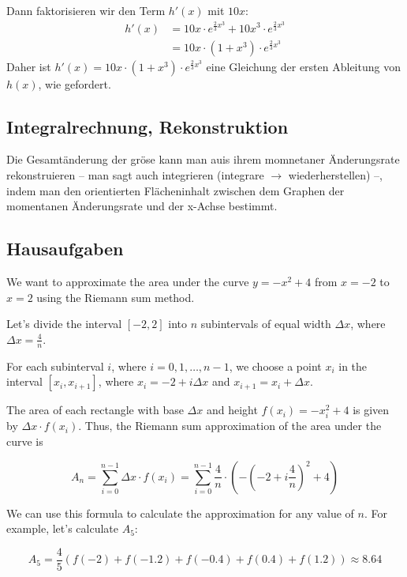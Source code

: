 \documentclass{report}
\begin{document}
Dann faktorisieren wir den Term $h'(x)$ mit $10x$:
\begin{align*}
  h'(x) &= 10x \cdot e^{\frac{2}{3} x^3} + 10x^3 \cdot e^{\frac{2}{3} x^3}\\
        &= 10x \cdot (1 + x^3) \cdot e^{\frac{2}{3} x^3}
\end{align*}
Daher ist $h'(x) = 10x \cdot (1+x^3) \cdot e^{\frac{2}{3} x^3}$ eine Gleichung
der ersten Ableitung von $h(x)$, wie gefordert.



\begin{multicols}{2}
\section{Integralrechnung, Rekonstruktion}
Die Gesamt\"anderung der gr\"ose kann man auis ihrem momnetaner \"Anderungsrate
rekonstruieren -- man sagt auch integrieren (integrare $\rightarrow$ wiederherstellen) --, 
indem man den orientierten Fl\"acheninhalt zwischen dem Graphen der momentanen \"Anderungsrate 
und der x-Achse bestimmt.


\subsection{Hausaufgaben}

We want to approximate the area under the curve $y=-x^2+4$ from $x=-2$ to $x=2$
using the Riemann sum method.

Let's divide the interval $[-2,2]$ into $n$ subintervals of equal width $\Delta
x$, where $\Delta x = \frac{4}{n}$.

For each subinterval $i$, where $i=0,1,\dots,n-1$, we choose a point $x_i$ in
the interval $[x_i,x_{i+1}]$, where $x_i = -2 + i\Delta x$ and $x_{i+1} = x_i +
\Delta x$.

The area of each rectangle with base $\Delta x$ and height $f(x_i) = -x_i^2+4$
is given by $\Delta x \cdot f(x_i)$. Thus, the Riemann sum approximation of the
area under the curve is

\[A_n = \sum_{i=0}^{n-1} \Delta x \cdot f(x_i) = \sum_{i=0}^{n-1} \frac{4}{n}
\cdot \left(-\left(-2 + i\frac{4}{n}\right)^2 + 4\right)\]

We can use this formula to calculate the approximation for any value of $n$.
For example, let's calculate $A_5$:

\[
A_5 = \frac{4}{5}\left(f(-2) + f(-1.2) + f(-0.4) + f(0.4) + f(1.2)\right) \approx 8.64
\]

\begin{center}
\end{center}


\end{multicols}
\end{document}
